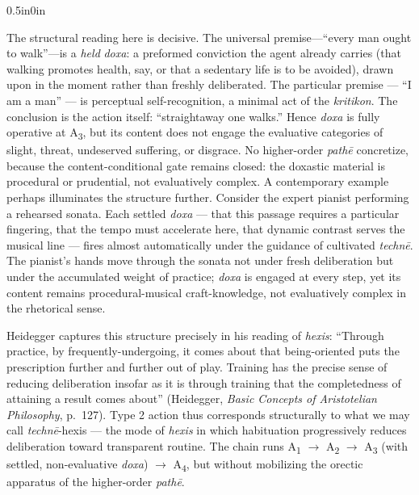 \documentclass{article}
\begin{document}
\begin{adjustwidth}{0.5in}{0in}
\end{adjustwidth} The structural reading here is decisive. The universal premise---``every man ought to walk''---is a \textit{held} \textit{doxa}: a preformed conviction the agent already carries (that walking promotes health, say, or that a sedentary life is to be avoided), drawn upon in the moment rather than freshly deliberated. The particular premise --- ``I am a man'' --- is perceptual self-recognition, a minimal act of the \textit{kritikon}. The conclusion is the action itself: ``straightaway one walks.'' Hence \textit{doxa} is fully operative at A\textsubscript{3}, but its content does not engage the evaluative categories of slight, threat, undeserved suffering, or disgrace. No higher-order \textit{path\=e} concretize, because the content-conditional gate remains closed: the doxastic material is procedural or prudential, not evaluatively complex. A contemporary example perhaps illuminates the structure further. Consider the expert pianist performing a rehearsed sonata. Each settled \textit{doxa} --- that this passage requires a particular fingering, that the tempo must accelerate here, that dynamic contrast serves the musical line --- fires almost automatically under the guidance of cultivated \textit{techn\=e}. The pianist's hands move through the sonata not under fresh deliberation but under the accumulated weight of practice; \textit{doxa} is engaged at every step, yet its content remains procedural-musical craft-knowledge, not evaluatively complex in the rhetorical sense. 

Heidegger captures this structure precisely in his reading of \textit{hexis}: ``Through practice, by frequently-undergoing, it comes about that being-oriented puts the prescription further and further out of play. Training has the precise sense of reducing deliberation insofar as it is through training that the completedness of attaining a result comes about'' (Heidegger, \textit{Basic Concepts of Aristotelian Philosophy}, p.~127). Type 2 action thus corresponds structurally to what we may call \textit{techn\=e}-hexis --- the mode of \textit{hexis} in which habituation progressively reduces deliberation toward transparent routine. The chain runs A\textsubscript{1} $\rightarrow$ A\textsubscript{2} $\rightarrow$ A\textsubscript{3} (with settled, non-evaluative \textit{doxa}) $\rightarrow$ A\textsubscript{4}, but without mobilizing the orectic apparatus of the higher-order \textit{path\=e}. 
\end{document}
